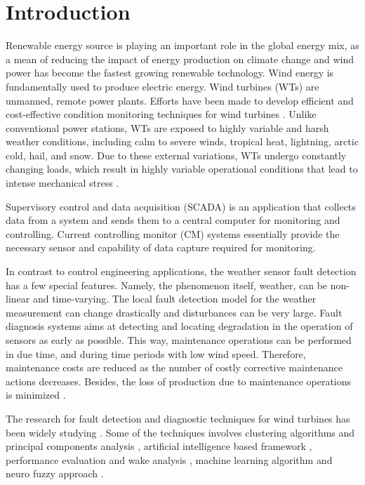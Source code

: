 \documentclass[conference]{IEEEtran}
\begin{document}
\section{Introduction}
Renewable energy source is playing an important role in the global energy mix, as a mean of reducing the impact of energy production on climate change and wind power has become the fastest growing renewable technology. 
Wind energy is fundamentally used to produce electric energy. Wind turbines (WTs) are unmanned, remote power plants.  Efforts have been made to develop efficient and cost-effective condition monitoring techniques for wind turbines \cite{yang2014wind}. Unlike conventional power stations, WTs are exposed to highly variable and harsh weather conditions, including calm to severe winds, tropical heat, lightning, arctic cold, hail, and snow. Due to these external variations, WTs undergo constantly changing loads, which result in highly variable operational conditions that lead to intense mechanical stress \cite{ribrant2006thesis}. 

Supervisory control and data acquisition (SCADA) is an application that collects data from a system and sends them to a central computer for monitoring and controlling. Current controlling monitor (CM) systems essentially provide the necessary sensor and capability of data capture required for monitoring.

In contrast to control engineering applications, the weather sensor fault detection has a few special features. Namely, the phenomenon itself, weather, can be non-linear and time-varying. The local fault detection model for the weather measurement can change drastically and disturbances can be very large. Fault diagnosis systems aims at detecting and locating degradation in the operation of sensors as early as possible. This way, maintenance operations can be performed in due time, and during time periods with low wind speed. Therefore, maintenance costs are reduced as the number of costly corrective maintenance actions decreases. Besides, the loss of production due to maintenance operations is minimized \cite{luo2014wind}.

The research for  fault detection and diagnostic techniques for wind turbines has been widely studying  \cite{tchakoua2014wind,wymore2015survey,lu2009review}. Some of the techniques involves
clustering algorithms and principal components analysis \cite{kim2011use}, artificial intelligence based framework \cite{wang2014scada}, performance evaluation and wake analysis \cite{astolfi2016mathematical}, machine learning algorithm \cite{kusiak2011prediction,schlechtingen2011comparative} and neuro fuzzy approach \cite{schlechtingen2012condition}.
\end{document}
